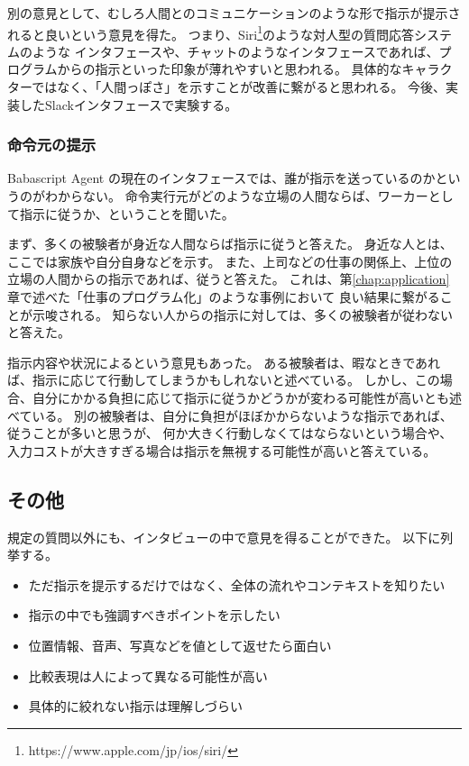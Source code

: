 別の意見として、むしろ人間とのコミュニケーションのような形で指示が提示されると良いという意見を得た。
つまり、Siri\footnote{https://www.apple.com/jp/ios/siri/}のような対人型の質問応答システムのような
インタフェースや、チャットのようなインタフェースであれば、プログラムからの指示といった印象が薄れやすいと思われる。
具体的なキャラクターではなく、「人間っぽさ」を示すことが改善に繋がると思われる。
今後、実装したSlackインタフェースで実験する。

\subsubsection{命令元の提示}\label{ux547dux4ee4ux5143ux306eux63d0ux793a}

Babascript Agent
の現在のインタフェースでは、誰が指示を送っているのかというのがわからない。
命令実行元がどのような立場の人間ならば、ワーカーとして指示に従うか、ということを聞いた。

まず、多くの被験者が身近な人間ならば指示に従うと答えた。
身近な人とは、ここでは家族や自分自身などを示す。
また、上司などの仕事の関係上、上位の立場の人間からの指示であれば、従うと答えた。
これは、第\ref{chap:application}章で述べた「仕事のプログラム化」のような事例において
良い結果に繋がることが示唆される。
知らない人からの指示に対しては、多くの被験者が従わないと答えた。

指示内容や状況によるという意見もあった。
ある被験者は、暇なときであれば、指示に応じて行動してしまうかもしれないと述べている。
しかし、この場合、自分にかかる負担に応じて指示に従うかどうかが変わる可能性が高いとも述べている。
別の被験者は、自分に負担がほぼかからないような指示であれば、従うことが多いと思うが、
何か大きく行動しなくてはならないという場合や、入力コストが大きすぎる場合は指示を無視する可能性が高いと答えている。

\subsection{その他}\label{ux305dux306eux4ed6}

規定の質問以外にも、インタビューの中で意見を得ることができた。
以下に列挙する。

\begin{itemize}
\itemsep1pt\parskip0pt
\item
  ただ指示を提示するだけではなく、全体の流れやコンテキストを知りたい
\item
  指示の中でも強調すべきポイントを示したい
\item
  位置情報、音声、写真などを値として返せたら面白い
\item
  比較表現は人によって異なる可能性が高い
\item
  具体的に絞れない指示は理解しづらい
\end{itemize}

